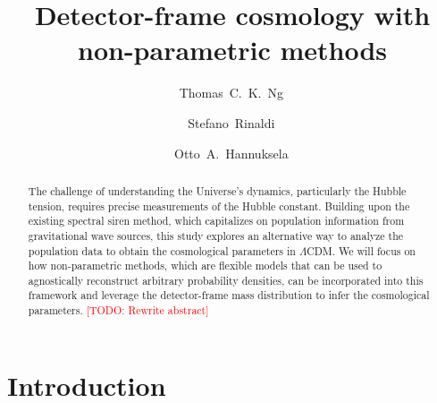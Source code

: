 \documentclass[aps,prd,twocolumn,superscriptaddress,preprintnumbers,nofootinbib,hidelinks]{revtex4-2}
\newcommand{\todo}[1]{\textcolor{red}{[TODO: #1]}}
\begin{document}
\title{Detector-frame cosmology with non-parametric methods}

\author{Thomas~C.~K.~Ng\,}

\author{Stefano~Rinaldi\,}

\author{Otto~A.~Hannuksela\,}

\begin{abstract}
    The challenge of understanding the Universe's dynamics, particularly the Hubble tension, requires precise measurements of the Hubble constant.
    Building upon the existing spectral siren method, which capitalizes on population information from gravitational wave sources, this study explores an alternative way to analyze the population data to obtain the cosmological parameters in $\Lambda$CDM.
    We will focus on how non-parametric methods, which are flexible models that can be used to agnostically reconstruct arbitrary probability densities, can be incorporated into this framework and leverage the detector-frame mass distribution to infer the cosmological parameters.
    \todo{Rewrite abstract}
\end{abstract}

\maketitle

\begin{acronym}
\end{acronym}

\section{Introduction}
\label{sec:introduction}
\end{document}
